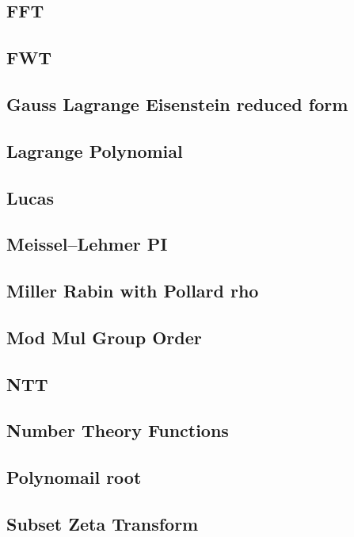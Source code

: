 \subsection{FFT}

\subsection{FWT}

\subsection{Gauss Lagrange Eisenstein reduced form}

\subsection{Lagrange Polynomial}

\subsection{Lucas}

\subsection{Meissel–Lehmer PI}

\subsection{Miller Rabin with Pollard rho}

\subsection{Mod Mul Group Order}

\subsection{NTT}

\subsection{Number Theory Functions}

\subsection{Polynomail root}

\subsection{Subset Zeta Transform}


